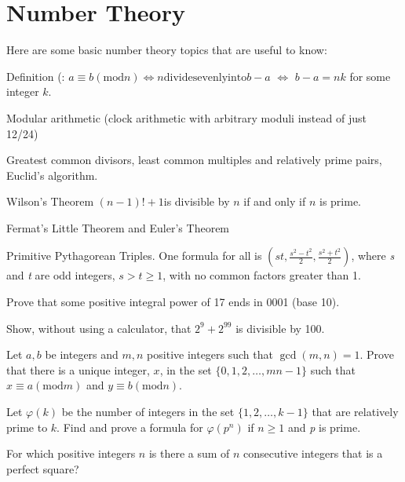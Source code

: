 \documentclass{article}
\begin{document}
\section{Number Theory}



Here are some basic number theory topics that are useful to know:


\item Definition (\pmb{ )}: { }\(a \equiv  b (\text{mod} n) \Longleftrightarrow  n \text{divides} \text{evenly}
\text{into} b-a\) \(\Longleftrightarrow\) \(b-a=n k\) { }for some integer \(k\).


\item Modular arithmetic { }(clock arithmetic with arbitrary moduli instead of just 12/24)


\item Greatest common divisors, least common multiples and relatively prime pairs, Euclid's algorithm. 


\item Wilson{'}s Theorem { }\((n-1)! +1\)is divisible by \(n\) if and only if { }\(n\) is prime.


\item Fermat{'}s Little Theorem and Euler's Theorem


\item Primitive Pythagorean Triples. { }One formula for all is { }\(\left(s t, \frac{s^2-t^2}{2}, \frac{s^2+t^2}{2}\right)\), where \textit{ s} and
\textit{ t} are odd integers, \(s>t\geq 1\), with no common factors greater than { }1.



Prove that some positive integral power of 17 ends in 0001 (base 10).

Show, without using a calculator, that \(2^9 + 2^{99}\) is divisible by 100.

Let \(a, b\) be integers and \(m, n\) positive integers such that \(\gcd (m,n)=1\). { }Prove that there is a unique integer, \(x\), { }in the set
\(\{0,1,2,\ldots , m n -1\}\) such that \(x\equiv a (\text{mod} m)\) and \(y\equiv b (\text{mod} n)\).

Let \(\varphi (k)\) be the number of integers in the set \(\{1,2, \ldots  , k-1\}\) that are relatively prime to \(k\). Find and prove a formula
for \(\varphi \left(p^n\right)\) if \(n\geq 1\) and \textit{ p} is prime.

 For which positive integers \(n\) is there a sum of \(n\) consecutive integers that is a perfect square?
\end{document}
